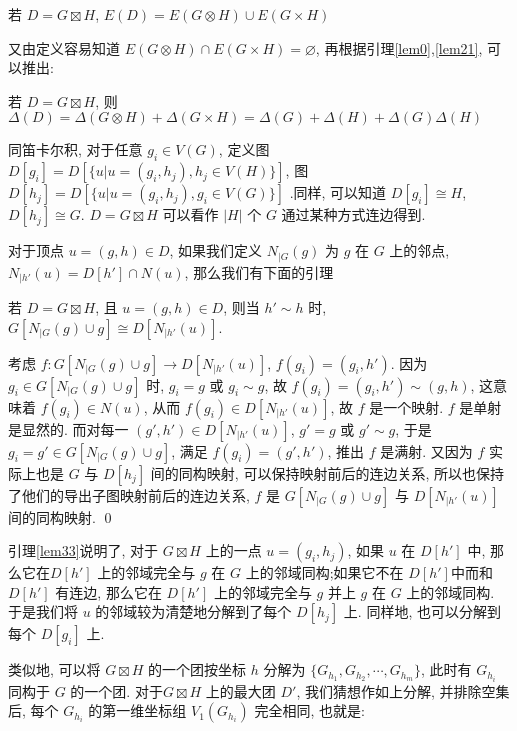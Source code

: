 \documentclass[12pt,a4paper]{article}%
\begin{document}
\begin{lemma}\label{lem31}
    若 $D=G \boxtimes H$, $E(D) = E(G \otimes H) \cup E(G \times H)$
\end{lemma}

又由定义容易知道 $E(G \otimes H) \cap E(G \times H) = \varnothing$, 再根据引理\ref{lem0},\ref{lem21}, 可以推出:

\begin{lemma}\label{lem32}
    若 $D = G \boxtimes H$, 则 $\Delta(D) = \Delta(G \otimes H) + \Delta(G \times H) = \Delta(G) + \Delta(H) + \Delta(G)\Delta(H)$
\end{lemma}

同笛卡尔积, 对于任意 $g_i \in V(G)$, 定义图 $D[g_i] = D[\{ u|u = (g_i, h_j), h_j \in V(H) \}]$, 图 $D[h_j] = D[\{ u|u = (g_i, h_j), g_i \in V(G) \}]$ .同样, 可以知道 $D[g_i] \cong H$, $D[h_j] \cong G$. $D = G \boxtimes H$ 可以看作 $|H|$ 个 $G$ 通过某种方式连边得到.

对于顶点 $u=(g,h) \in D$, 如果我们定义 $N_{|G}(g)$ 为 $g$ 在 $G$ 上的邻点, $N_{|h'}(u) = D[h'] \cap N(u)$, 那么我们有下面的引理  

\begin{lemma}\label{lem33}
    若 $D = G \boxtimes H$, 且 $u=(g,h) \in D$, 则当 $h' \sim h$ 时, $G[N_{|G}(g) \cup g] \cong D[N_{|h'}(u)]$.
\end{lemma}
\begin{pf}
    考虑 $f: G[N_{|G}(g) \cup g] \rightarrow D[N_{|h'}(u)]$, $f(g_i) = (g_i,h')$. 因为 $g_i \in G[N_{|G}(g) \cup g]$ 时, $g_i = g$ 或 $g_i \sim g$, 故 $f(g_i) = (g_i,h') \sim (g,h)$, 这意味着 $f(g_i) \in N(u)$, 从而 $f(g_i) \in D[N_{|h'}(u)]$, 故 $f$ 是一个映射. $f$ 是单射是显然的. 而对每一 $(g',h') \in D[N_{|h'}(u)]$, $g' = g$ 或 $g' \sim g$, 于是 $g_i = g' \in G[N_{|G}(g) \cup g]$, 满足 $f(g_i) = (g',h')$, 推出 $f$ 是满射. 又因为 $f$ 实际上也是 $G$ 与 $D[h_j]$ 间的同构映射, 可以保持映射前后的连边关系, 所以也保持了他们的导出子图映射前后的连边关系, $f$ 是 $G[N_{|G}(g) \cup g] $ 与 $D[N_{|h'}(u)]$ 间的同构映射. \qed
\end{pf}

引理\ref{lem33}说明了, 对于 $G \boxtimes H$ 上的一点 $u=(g_i,h_j)$, 如果 $u$ 在 $D[h']$ 中, 那么它在$D[h']$ 上的邻域完全与 $g$ 在 $G$ 上的邻域同构;如果它不在 $D[h']$中而和 $D[h']$ 有连边, 那么它在 $D[h']$ 上的邻域完全与 $g$ 并上 $g$ 在 $G$ 上的邻域同构. 于是我们将 $u$ 的邻域较为清楚地分解到了每个 $D[h_j]$ 上. 同样地, 也可以分解到每个 $D[g_i]$ 上.

类似地, 可以将 $G \boxtimes H$ 的一个团按坐标 $h$ 分解为 $\{G_{h_1}, G_{h_2}, \cdots, G_{h_m} \}$, 此时有 $G_{h_i}$ 同构于 $G$ 的一个团. 对于$G \boxtimes H$ 上的最大团 $D'$, 我们猜想作如上分解, 并排除空集后, 每个 $G_{h_i}$ 的第一维坐标组 $V_{1}(G_{h_i})$ 完全相同, 也就是:
\end{document}
